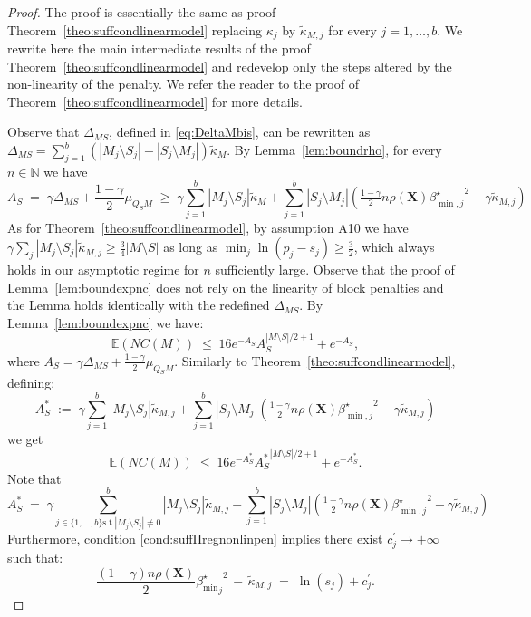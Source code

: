 \documentclass[aos]{imsart}
\theoremstyle{plain}
\newcommand{\E}{\mathbb{E}}
\newcommand{\N}{\mathbb{N}}
\newcommand{\bs}{\boldsymbol}
\begin{document}
\begin{proof}
The proof is essentially the same as proof Theorem~\ref{theo:suffcondlinearmodel} replacing $\kappa_j$ by $\tilde{\kappa}_{M, j}$ for every $j=1,\ldots,b$. We rewrite here the main intermediate results of the proof Theorem~\ref{theo:suffcondlinearmodel} and redevelop only the steps altered by the non-linearity of the penalty. We refer the reader to the proof of Theorem~\ref{theo:suffcondlinearmodel} for more details.

Observe that $\Delta_{MS}$, defined in \eqref{eq:DeltaMbis}, can be rewritten as $\Delta_{MS}=\sum_{j=1}^b(|M_j\setminus S_j|-|S_j\setminus M_j|)\tilde{\kappa}_{M}$. By  Lemma~\ref{lem:boundrho}, for every $n\in \N$ we have 
\begin{equation}\label{eq:nonoverfittingcondgen}
   A_S\;=\; \gamma \Delta_{MS}+\frac{1-\gamma}{2}\mu_{Q_SM}\;\geq\; \gamma\sum_{j=1}^b|M_j \setminus S_j|\tilde{\kappa}_{M} + \sum_{j=1}^b |S_j\setminus M_j |\left(\tfrac{1-\gamma}{2} n \rho(\bs X) {\beta^{\star}_{\min,j}}^{2} - \gamma\tilde{\kappa}_{M, j}\right) 
\end{equation} 
As for Theorem~\ref{theo:suffcondlinearmodel}, by assumption A10 we have $\gamma\sum_{j}|M_j\setminus S_j|\tilde{\kappa}_{M, j}\geq \tfrac{3}{4}|M\setminus S|$ as long as $\min_j \ln(p_j-s_j)\geq \tfrac32$, which always holds in our asymptotic regime for $n$ sufficiently large. Observe that the proof of Lemma~\ref{lem:boundexpnc} does not rely on the linearity of block penalties and the Lemma holds identically with the redefined $\Delta_{MS}$.  By Lemma~\ref{lem:boundexpnc} we have:
$$
\E(NC(M))\;\leq\;16 e^{-A_S}A_S^{|M\setminus S|/2+1}+e^{-A_S},
$$
where $A_S=\gamma\Delta_{MS}+\tfrac{1-\gamma}{2}\mu_{Q_SM}$. Similarly to Theorem~\ref{theo:suffcondlinearmodel}, defining:
$$A_S^*\;:=\;\gamma\sum_{j=1}^b|M_j \setminus S_j|\tilde{\kappa}_{M, j} + \sum_{j=1}^b |S_j\setminus M_j |\left(\tfrac{1-\gamma}{2} n \rho(\bs X) {\beta^{\star}_{\min,j}}^{2} - \gamma\tilde{\kappa}_{M, j}\right) $$
we get 
$$
\E(NC(M))\;\leq\;16 e^{-A_S^*}{A_S^*}^{|M\setminus S|/2+1}+e^{-A_S^*}.
$$
Note that 
$$A_S^*\;=\;\gamma\sum_{j \in \{1,\ldots, b\} \text{s.t.} |M_j \setminus S_j| \neq 0}^b|M_j \setminus S_j|\tilde{\kappa}_{M, j} + \sum_{j=1}^b |S_j\setminus M_j |\left(\tfrac{1-\gamma}{2} n \rho(\bs X) {\beta^{\star}_{\min,j}}^{2} - \gamma\tilde{\kappa}_{M, j}\right) $$
Furthermore, condition \eqref{cond:suffIIregnonlinpen} implies there exist $c^{\prime}_j \to +\infty$ such that:
$$\frac{(1-\gamma) n\rho(\bs X)}{2}{{\beta_{\min}^{\star}}_j}^2 \,- \,\tilde{\kappa}_{M, j} \;=\; \ln(s_j) + c^{\prime}_{j}.$$

\end{proof}
\end{document}
